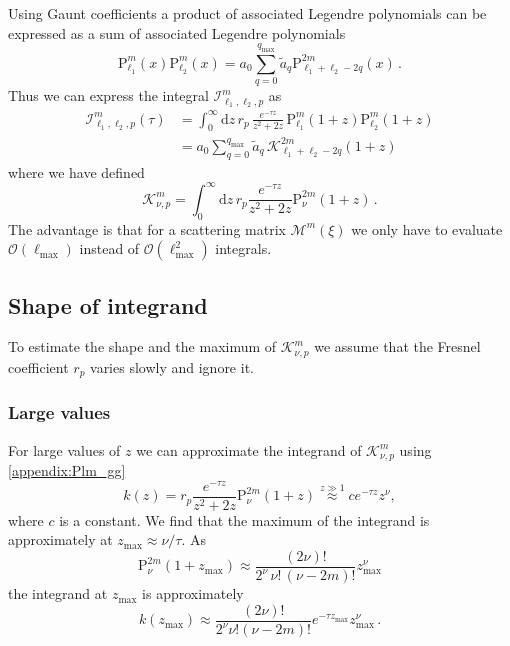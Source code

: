 \documentclass[superscriptaddress,prb]{revtex4-1}
\newcommand{\e}{e}    %
\newcommand{\Plm}[2]{{\text{P}_{#1}^{#2}}}
\newcommand{\lmax}{{\ell_\text{max}}}
\newcommand{\tmax}{{\text{max}}}
\begin{document}
Using Gaunt coefficients a product of associated Legendre polynomials can be
expressed as a sum of associated Legendre polynomials \cite{gaunt}
\begin{equation}
\Plm{\ell_1}{m}(x) \Plm{\ell_2}{m}(x) = a_0 \sum_{q=0}^{q_\tmax} \tilde a_q \Plm{\ell_1+\ell_2-2q}{2m}(x) \,.
\end{equation}
Thus we can express the integral $\mathcal{I}_{\ell_1,\ell_2,p}^{m}$ as
\begin{align}
\nonumber
\mathcal{I}_{\ell_1,\ell_2,p}^{m}(\tau) &= \int_0^\infty \mathrm{d}z \, r_p \, \frac{\e^{-\tau z}}{z^2+2z} \, \Plm{\ell_1}{m}(1+z) \Plm{\ell_2}{m}(1+z) \\
& = a_0 \sum_{q=0}^{q_\tmax} \tilde a_q \, \mathcal{K}_{\ell_1+\ell_2-2q}^{2m}(1+z)
\end{align}
where we have defined
\begin{equation}
\mathcal{K}_{\nu,p}^m = \int_0^\infty \mathrm{d}z \, r_p \frac{\e^{-\tau z}}{z^2+2z} \Plm{\nu}{2m}(1+z) \,.
\end{equation}
The advantage is that for a scattering matrix $\mathcal{M}^m(\xi)$ we only have
to evaluate $\mathcal{O}(\lmax)$ instead of $\mathcal{O}(\ell_\tmax^2)$
integrals.

\subsection{Shape of integrand}

To estimate the shape and the maximum of $\mathcal{K}_{\nu,p}^m$ we assume that
the Fresnel coefficient $r_p$ varies slowly and ignore it.

\subsubsection{Large values}
For large values of $z$ we can approximate the integrand of
$\mathcal{K}_{\nu,p}^m$ using \eqref{appendix:Plm_gg}
\begin{equation}
k(z) = r_p \frac{\e^{-\tau z}}{z^2+2z} \Plm{\nu}{2m}(1+z) \overset{z \gg 1}{\approx} c \e^{-\tau z} z^\nu ,
\end{equation}
where $c$ is a constant. We find that the maximum of the integrand is
approximately at $z_\tmax \approx \nu/\tau$. As
\begin{equation}
\Plm{\nu}{2m}(1+z_\tmax) \approx \frac{(2\nu)!}{2^\nu \, \nu! \, (\nu-2m)!} z_\tmax^\nu
\end{equation}
the integrand at $z_\tmax$ is approximately
\begin{equation}
k(z_\tmax) \approx \frac{(2\nu)!}{2^\nu \nu! (\nu-2m)!} \e^{-\tau z_\tmax} z_\tmax^\nu \,.
\end{equation}
\end{document}
